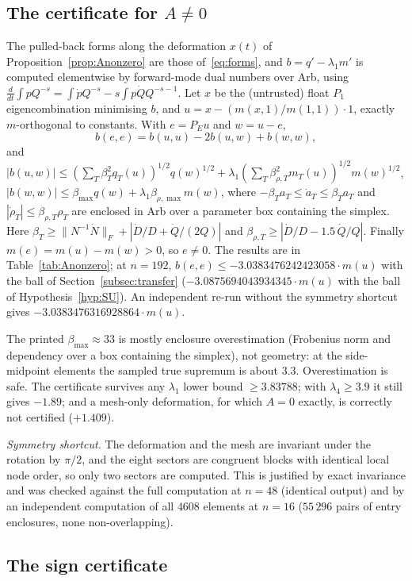 \documentclass[11pt]{amsart}
\theoremstyle{definition}
\theoremstyle{remark}
\begin{document}
\subsection{The certificate for $A\ne0$}\label{subsec:Anonzero-cert}
The pulled-back forms along the deformation $x(t)$ of Proposition~\ref{prop:Anonzero} are those
of~\eqref{eq:forms}, and $b=q'-\lambda_1m'$ is computed elementwise by forward-mode dual numbers over
Arb, using $\frac{d}{dt}\int pQ^{-s}=\int\dot pQ^{-s}-s\int p\dot QQ^{-s-1}$. Let $x$ be the (untrusted)
float $P_1$ eigencombination minimising $b$, and $u=x-(m(x,1)/m(1,1))\cdot1$, exactly
$m$-orthogonal to constants. With $e=P_Eu$ and $w=u-e$,
\[
b(e,e)=b(u,u)-2b(u,w)+b(w,w),
\]
and
$|b(u,w)|\le(\sum_T\beta_T^2q_T(u))^{1/2}q(w)^{1/2}+\lambda_1(\sum_T\beta_{\rho,T}^2m_T(u))^{1/2}m(w)^{1/2}$,
$|b(w,w)|\le\beta_{\max}q(w)+\lambda_1\beta_{\rho,\max}m(w)$, where $-\beta_Ta_T\le\dot a_T\le\beta_Ta_T$ and
$|\dot\rho_T|\le\beta_{\rho,T}\rho_T$ are enclosed in Arb over a parameter box containing the simplex.
Here $\beta_T\ge\|N^{-1}\dot N\|_F+|\dot D/D+\dot Q/(2Q)|$ and $\beta_{\rho,T}\ge|\dot D/D-1.5\,\dot Q/Q|$.
Finally $m(e)=m(u)-m(w)>0$, so $e\ne0$. The results are in Table~\ref{tab:Anonzero}; at $n=192$,
$b(e,e)\le-3.0383476242423058\cdot m(u)$ with the ball of Section~\ref{subsec:transfer}
($-3.0875694043934345\cdot m(u)$ with the ball of Hypothesis~\ref{hyp:SU}). An independent re-run
without the symmetry shortcut gives $-3.0383476316928864\cdot m(u)$.

The printed $\beta_{\max}\approx33$ is mostly enclosure overestimation (Frobenius norm and
dependency over a box containing the simplex), not geometry: at the side-midpoint elements the
sampled true supremum is about $3.3$. Overestimation is safe. The certificate survives any
$\lambda_1$ lower bound $\ge3.83788$; with $\lambda_4\ge3.9$ it still gives $-1.89$; and a mesh-only
deformation, for which $A=0$ exactly, is correctly not certified ($+1.409$).

\emph{Symmetry shortcut.} The deformation and the mesh are invariant under the rotation by
$\pi/2$, and the eight sectors are congruent blocks with identical local node order, so only two
sectors are computed. This is justified by exact invariance and was checked against the full
computation at $n=48$ (identical output) and by an independent computation of all $4608$ elements
at $n=16$ ($55\,296$ pairs of entry enclosures, none non-overlapping).

\subsection{The sign certificate}\label{subsec:sign-cert}
\end{document}
